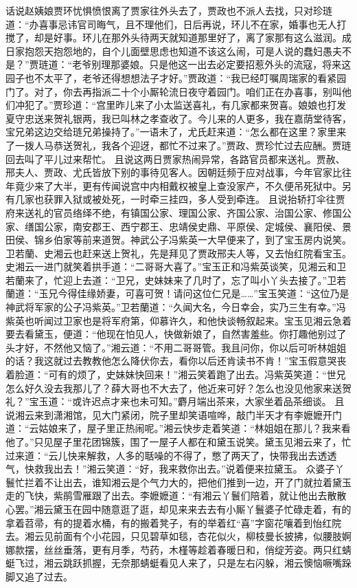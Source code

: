 \documentclass[12pt,oneside]{book}
\begin{document}
话说赵姨娘贾环忧惧愤恨离了贾家往外头去了，贾政也不派人去找，只对珍琏道：“办喜事忌讳官司晦气，且不理他们，日后再说，环儿不在家，婚事也无人打搅了，却是好事。环儿在那外头待两天就知道那里好了，离了家那有这么滋润。成日家抱怨天抱怨地的，自个儿面壁思虑也知道不该这么闹，可是人说的蠢妇愚夫不是？”贾琏道：“老爷别理那婆娘。只是他这一出去必定要招惹外头的流寇，将来这园子也不太平了，老爷还得想想法子才好。”贾政道：“我已经叮嘱周瑞家的看紧园门了。对了，你去再指派二十个小厮轮流日夜守着园门。咱们正在办喜事，别叫他们冲犯了。”贾珍道：“宫里昨儿来了小太监送喜礼，有几家都来贺喜。娘娘也打发夏守忠送来贺礼银两，我已叫林之孝查收了。今儿来的人更多，我在嘉荫堂待客，宝兄弟这边交给琏兄弟操持了。”一语未了，尤氏赶来道：“怎么都在这里？家里来了一拨人马恭送贺礼，我各个迎迓，都忙不过来了。”贾政、贾珍忙过去应酬。贾琏回去叫了平儿过来帮忙。
且说这两日贾家热闹异常，各路官员都来送礼。贾赦、邢夫人、贾政、尤氏皆放下别的事待见客人。因朝廷频于应对战事，今年官家比往年竟少来了大半，更有传闻说宫中内相戴权被皇上查没家产，不久便吊死狱中。另有几家也获罪入狱或被处死，一时牵三挂四，多人受到牵连。
且说抬轿打伞往贾府来送礼的官员络绎不绝，有镇国公家、理国公家、齐国公家、治国公家、修国公家、缮国公家，南安郡王、西宁郡王、忠靖侯史鼎、平原侯、定城侯、襄阳侯、景田侯、锦乡伯家等前来道贺。神武公子冯紫英一大早便来了，到了宝玉房内说笑。卫若蘭、史湘云也赶来送上贺礼，先是拜见了贾政邢夫人等，又去怡红院看宝玉。
史湘云一进门就笑着拱手道：“二哥哥大喜了。”宝玉正和冯紫英谈笑，见湘云和卫若蘭来了，忙迎上去道：“卫兄，史妹妹来了几时了，忘了叫小丫头去接了。”卫若蘭道：“玉兄今得佳缘娇妻，可喜可贺！请问这位仁兄是……”宝玉笑道：“这位乃是神武将军家的公子冯紫英。”卫若蘭道：“久闻大名，今日幸会，实乃三生有幸。”冯紫英也听闻过卫家也是将军府第，仰慕许久，和他快谈畅叙起来。宝玉见湘云急着要去看黛玉，便道：“他现在怕见人，快做新娘了，自然害羞些。你打趣他别过了头才好，不然他又恼了。”湘云道：“不用二哥哥管。我且问你，你以后可听林姐姐的话？我这就过去教教他怎么降伏你去，看你以后还肯读书不肯！”宝玉假意哭丧着脸道：“可有的烦了，史妹妹快回来！”湘云笑着跑了出去。冯紫英笑道：“世兄怎么好久没去我那儿了？薛大哥也不大去了，他近来可好？怎么也没见他家来送贺礼？”宝玉道：“或许迟点才来也未可知。”麝月端出茶来，大家坐着品茶细谈。
且说湘云来到潇湘馆，见大门紧闭，院子里却笑语喧哗，敲门半天才有李嬷嬷开门道：“云姑娘来了，屋子里正热闹呢。”湘云快步走着笑道：“林姐姐在那儿？我来看他了。”只见屋子里花团锦簇，围了一屋子人都在和黛玉说笑。黛玉见湘云来了，忙过来道：“云儿快来解救，人多的聒噪的不得了，憋了两天了，快带我出去透透气，快救我出去！”湘云笑道：“好，我来救你出去。”说着便来拉黛玉。
众婆子丫鬟忙拦着不让出去，谁知湘云是个气力大的，把他们推到一边，开了门就拉着黛玉走的飞快，紫鹃雪雁跟了出去。李嬷嬷道：“有湘云丫鬟们陪着，就让他出去散散心罢。”湘云黛玉在园中随意逛了逛，却见来来去去有小厮丫鬟婆子忙碌走着，有的拿着苕帚，有的提着水桶，有的搬着凳子，有的举着红“喜”字窗花嚷着到怡红院去。湘云见前面有个小花园，只见碧草如毯，杏花似火，柳枝曼长披拂，似腰肢婀娜款摆，丝丝垂落，更有月季，芍药，木槿等趁着春暖日和，俏绽芳姿。两只红蜻蜓飞过，湘云跳跃抓握，无奈那蜻蜓看见人来了，只是左右闪躲，湘云懊恼噘嘴跺脚又追了过去。
\end{document}
